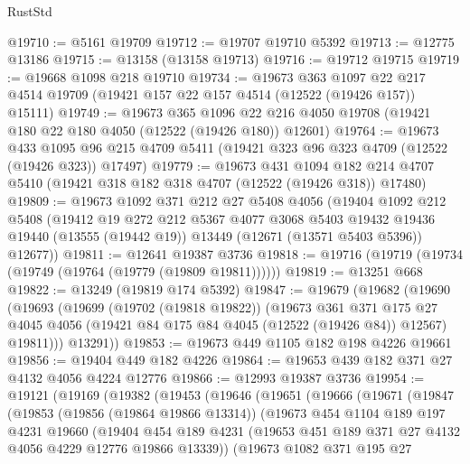 \begin{lexlean}{RustStd}
\begin{coremodule}
@19710 := @5161 @19709
@19712 := @19707 @19710 @5392
@19713 := @12775 @13186
@19715 := @13158 (@13158 @19713)
@19716 := @19712 @19715
@19719 := @19668 @1098 @218 @19710
@19734 := @19673
    @363
    @1097
    @22
    @217
    @4514
    @19709
    (@19421 @157 @22 @157 @4514 (@12522 (@19426 @157)) @15111)
@19749 := @19673
    @365
    @1096
    @22
    @216
    @4050
    @19708
    (@19421 @180 @22 @180 @4050 (@12522 (@19426 @180)) @12601)
@19764 := @19673
    @433
    @1095
    @96
    @215
    @4709
    @5411
    (@19421 @323 @96 @323 @4709 (@12522 (@19426 @323)) @17497)
@19779 := @19673
    @431
    @1094
    @182
    @214
    @4707
    @5410
    (@19421 @318 @182 @318 @4707 (@12522 (@19426 @318)) @17480)
@19809 := @19673
    @1092
    @371
    @212
    @27
    @5408
    @4056
    (@19404
      @1092
      @212
      @5408
      (@19412
        @19
        @272
        @212
        @5367
        @4077
        @3068
        @5403
        @19432
        @19436
        @19440
        (@13555 (@19442 @19))
        @13449
        (@12671 (@13571 @5403 @5396))
        @12677))
@19811 := @12641 @19387 @3736
@19818 := @19716 (@19719 (@19734 (@19749 (@19764 (@19779 (@19809 @19811))))))
@19819 := @13251 @668
@19822 := @13249 (@19819 @174 @5392)
@19847 := @19679
    (@19682
      (@19690
        (@19693
          (@19699
            (@19702 (@19818 @19822))
            (@19673
              @361
              @371
              @175
              @27
              @4045
              @4056
              (@19421 @84 @175 @84 @4045 (@12522 (@19426 @84)) @12567)
              @19811)))
        @13291))
@19853 := @19673 @449 @1105 @182 @198 @4226 @19661
@19856 := @19404 @449 @182 @4226
@19864 := @19653 @439 @182 @371 @27 @4132 @4056 @4224 @12776
@19866 := @12993 @19387 @3736
@19954 := @19121
    (@19169
      (@19382
        (@19453
          (@19646
            (@19651
              (@19666
                (@19671
                  (@19847
                    (@19853
                      (@19856 (@19864 @19866 @13314))
                      (@19673
                        @454
                        @1104
                        @189
                        @197
                        @4231
                        @19660
                        (@19404
                          @454
                          @189
                          @4231
                          (@19653 @451 @189 @371 @27 @4132 @4056 @4229 @12776 @19866 @13339))
                        (@19673
                          @1082
                          @371
                          @195
                          @27

\end{coremodule}
\end{lexlean}
